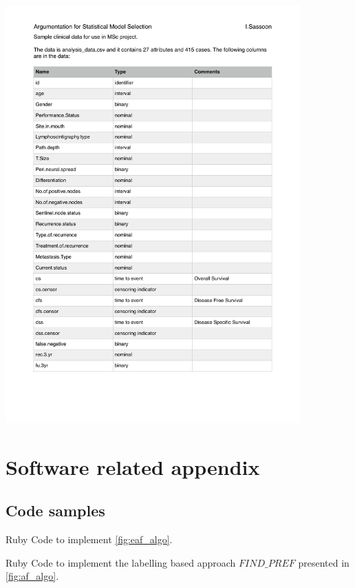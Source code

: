 {	\includegraphics[page=2,width=0.85\textwidth]{appendix/analysis_data.pdf}
}



\section{Software related appendix}
\label{app:b}
\subsection{Code samples}

\begin{listing}[H]
	\centering
	\caption{Ruby Code to implement \autoref{fig:eaf_algo}.}
	\label{lst:eaf}
\end{listing}

\begin{listing}[H]
	\centering
	\caption{Ruby Code to implement the labelling based approach $FIND\_PREF$ presented in \autoref{fig:af_algo}.}
	\label{lst:af}
\end{listing}

